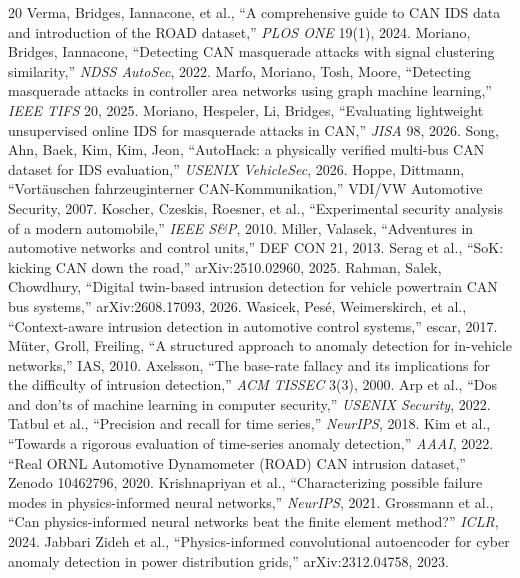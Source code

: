 \documentclass[10pt,twocolumn]{article}
\begin{document}
\begin{thebibliography}{20}\small
{} Verma, Bridges, Iannacone, et al., ``A comprehensive guide to CAN IDS data and introduction of the ROAD dataset,'' \emph{PLOS ONE} 19(1), 2024.
 Moriano, Bridges, Iannacone, ``Detecting CAN masquerade attacks with signal clustering similarity,'' \emph{NDSS AutoSec}, 2022.
 Marfo, Moriano, Tosh, Moore, ``Detecting masquerade attacks in controller area networks using graph machine learning,'' \emph{IEEE TIFS} 20, 2025.
 Moriano, Hespeler, Li, Bridges, ``Evaluating lightweight unsupervised online IDS for masquerade attacks in CAN,'' \emph{JISA} 98, 2026.
 Song, Ahn, Baek, Kim, Kim, Jeon, ``AutoHack: a physically verified multi-bus CAN dataset for IDS evaluation,'' \emph{USENIX VehicleSec}, 2026.
 Hoppe, Dittmann, ``Vort\"auschen fahrzeuginterner CAN-Kommunikation,'' VDI/VW Automotive Security, 2007.
 Koscher, Czeskis, Roesner, et al., ``Experimental security analysis of a modern automobile,'' \emph{IEEE S\&P}, 2010.
 Miller, Valasek, ``Adventures in automotive networks and control units,'' DEF CON 21, 2013.
 Serag et al., ``SoK: kicking CAN down the road,'' arXiv:2510.02960, 2025.
 Rahman, Salek, Chowdhury, ``Digital twin-based intrusion detection for vehicle powertrain CAN bus systems,'' arXiv:2608.17093, 2026.
 Wasicek, Pes\'e, Weimerskirch, et al., ``Context-aware intrusion detection in automotive control systems,'' escar, 2017.
 M\"uter, Groll, Freiling, ``A structured approach to anomaly detection for in-vehicle networks,'' IAS, 2010.
 Axelsson, ``The base-rate fallacy and its implications for the difficulty of intrusion detection,'' \emph{ACM TISSEC} 3(3), 2000.
 Arp et al., ``Dos and don'ts of machine learning in computer security,'' \emph{USENIX Security}, 2022.
 Tatbul et al., ``Precision and recall for time series,'' \emph{NeurIPS}, 2018.
 Kim et al., ``Towards a rigorous evaluation of time-series anomaly detection,'' \emph{AAAI}, 2022.
 ``Real ORNL Automotive Dynamometer (ROAD) CAN intrusion dataset,'' Zenodo 10462796, 2020.
 Krishnapriyan et al., ``Characterizing possible failure modes in physics-informed neural networks,'' \emph{NeurIPS}, 2021.
 Grossmann et al., ``Can physics-informed neural networks beat the finite element method?'' \emph{ICLR}, 2024.
 Jabbari Zideh et al., ``Physics-informed convolutional autoencoder for cyber anomaly detection in power distribution grids,'' arXiv:2312.04758, 2023.
\end{thebibliography}
\end{document}
